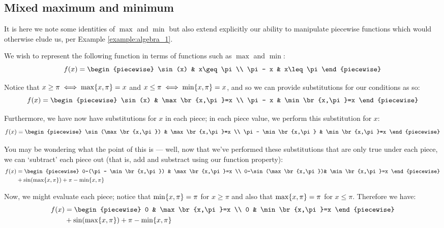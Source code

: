 \subsection{Mixed maximum and minimum}
It is here we note some identities of $\max$ and $\min$ but also extend explicitly our ability to manipulate piecewise functions which would otherwise elude us, per Example \ref{example:algebra_1}.

\begin{example}
    We wish to represent the following function in terms of functions such as $\max$ and $\min$:
    $$
        f(x) = \begin{piecewise}
            \sin(x) & x\geq\pi \\
            \pi - x & x\leq\pi
        \end{piecewise}
    $$

    Notice that $x\geq\pi\iff\max\{x,\pi\}=x$ and $x\leq\pi\iff\min\{x,\pi\}=x$, and so we can provide substitutions for our conditions as so:
    $$
        f(x) = \begin{piecewise}
            \sin(x) & \max\br{x,\pi}=x \\
            \pi - x & \min\br{x,\pi}=x
        \end{piecewise}
    $$

    Furthermore, we have now have substitutions for $x$ in each piece; in each piece value, we perform this substitution for $x$:
    $$
        f(x) = \begin{piecewise}
            \sin(\max\br{x,\pi}) & \max\br{x,\pi}=x \\
            \pi - \min\br{x,\pi} & \min\br{x,\pi}=x
        \end{piecewise}
    $$

    You may be wondering what the point of this is --- well, now that we've performed these substitutions that are only true under each piece, we can `subtract' each piece out (that is, add and substract using our function property):
    \begin{align*}
        f(x) &= \begin{piecewise}
            0-(\pi - \min\br{x,\pi}) & \max\br{x,\pi}=x \\
            0-\sin(\max\br{x,\pi})& \min\br{x,\pi}=x
        \end{piecewise} \\
        &+\sin(\max\br{x,\pi})+\pi - \min\br{x,\pi}
    \end{align*}

    Now, we might evaluate each piece; notice that $\min\{x,\pi\}=\pi$ for $x\geq\pi$ and also that $\max\{x,\pi\}=\pi$ for $x\leq\pi$. Therefore we have:
    \begin{align*}
        f(x) &= \begin{piecewise}
            0 & \max\br{x,\pi}=x \\
            0 & \min\br{x,\pi}=x
        \end{piecewise} \\
        &+\sin(\max\br{x,\pi})+\pi - \min\br{x,\pi}
    \end{align*}


\end{example}
